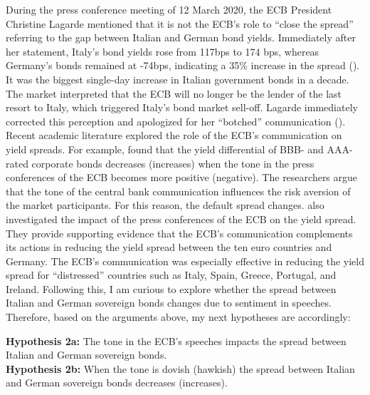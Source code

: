 During the press conference meeting of 12 March 2020, the ECB President Christine Lagarde mentioned that it is not the ECB’s role to “close the spread” referring to the gap between Italian and German bond yields. Immediately after her statement, Italy’s bond yields rose from 117bps to 174 bps, whereas Germany’s bonds remained at -74bps, indicating a 35\% increase in the spread (\cite{leombroni2021}). It was the biggest single-day increase in Italian government bonds in a decade. The market interpreted that the ECB will no longer be the lender of the last resort to Italy, which triggered Italy’s bond market sell-off. Lagarde immediately corrected this perception and apologized for her “botched” communication (\cite{arnold2020}). Recent academic literature explored the role of the ECB’s communication on yield spreads. For example, \textcite{schmeling2019} found that the yield differential of BBB- and AAA-rated corporate bonds decreases (increases) when the tone in the press conferences of the ECB becomes more positive (negative). The researchers argue that the tone of the central bank communication influences the risk aversion of the market participants. For this reason, the default spread changes. \textcite{beaupain2020} also investigated the impact of the press conferences of the ECB on the yield spread. They provide supporting evidence that the ECB’s communication complements its actions in reducing the yield spread between the ten euro countries and Germany. The ECB’s communication was especially effective in reducing the yield spread for “distressed” countries such as Italy, Spain, Greece, Portugal, and Ireland. Following this, I am curious to explore whether the spread between Italian and German sovereign bonds changes due to sentiment in speeches. Therefore, based on the arguments above, my next hypotheses are accordingly:


\textbf{Hypothesis 2a:} The tone in the ECB’s speeches impacts the spread between Italian and German sovereign bonds.\\
\textbf{Hypothesis 2b:} When the tone is dovish (hawkish) the spread between Italian and German sovereign bonds decreases (increases).

